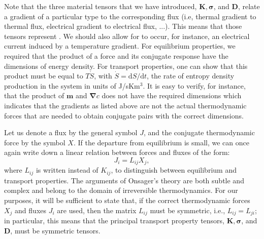 
Note that the three material tensors that we have introduced, $\bm{K}, \bm{\sigma}$, and $\bm{D}$, relate a gradient of a particular type to the corresponding flux  (i.e, thermal gradient to thermal flux, electrical gradient to electrical flux, ...).  This means that those tensors represent . We should also allow for  to occur, for instance, an electrical current induced by a temperature gradient. For equilibrium properties, we required that the product of a force and its conjugate response have the dimensions of energy density.  For transport properties, one can show that this product must be equal to $T\dot{S}$, with $\dot{S}=\mathrm{d}S/\mathrm{d}t$, the rate of entropy density production in the system in units of J/sKm$^3$.  It is easy to verify, for instance, that the product of $\mathbf{m}$ and $\bm{\nabla} c$ does not have the required dimensions which indicates that the gradients as listed above are not the actual thermodynamic forces that are needed to obtain conjugate pairs with the correct dimensions.

Let us denote a flux by the general symbol $J$, and the conjugate thermodynamic force by the symbol $X$.  If the departure from equilibrium is small, we can once again write down a linear relation between forces and fluxes of the form:
\[
	J_{i}  = L_{ij} X_j,
\]
where $L_{ij}$ is written instead of $K_{ij}$, to distinguish between equilibrium and transport properties.  The arguments of Onsager's theory are both subtle and complex and belong to the domain of irreversible thermodynamics. For our purposes, it will be sufficient to state that, if the correct thermodynamic forces $X_j$ and fluxes $J_i$ are used, then the matrix $L_{ij}$ must be symmetric,  i.e., $L_{ij}=L_{ji}$; in particular,  this means that the principal transport property tensors, $\bm{K}, \bm{\sigma}$, and $\bm{D}$, must be symmetric tensors.

